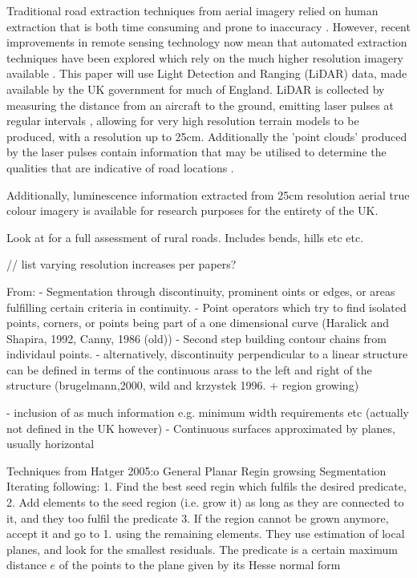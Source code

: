 \begin{multicols}{2}
Traditional road extraction techniques from aerial imagery relied on human extraction that is both time consuming and prone to inaccuracy \citep{wang2015}. However, recent improvements in remote sensing technology now mean that automated extraction techniques have been explored which rely on the much higher resolution imagery available \citep{xu2018}. This paper will use Light Detection and Ranging (LiDAR) data, made available by the UK government for much of England. LiDAR is collected by measuring the distance from an aircraft to the ground, emitting laser pulses at regular intervals \citep{environmentagency2019}, allowing for very high resolution terrain models to be produced, with a resolution up to 25cm. Additionally the 'point clouds' produced by the laser pulses contain information that may be utilised to determine the qualities that are indicative of road locations \citep[e.g.][]{clode2004}.

Additionally, luminescence information extracted from 25cm resolution aerial true colour imagery is available for research purposes for the entirety of the UK.


Look at \citep{taylor2002} for a full assessment of rural roads. Includes bends, hills etc etc.

// list varying resolution increases per papers?

From: \citep{hatger2005}
- Segmentation through discontinuity, prominent oints or edges, or areas fulfilling certain criteria in continuity.
- Point operators which try to find isolated points, corners, or points being part of a one dimensional curve (Haralick and Shapira, 1992, Canny, 1986 (old))
- Second step building contour chains from individaul points.
- alternatively, discontinuity perpendicular to a linear structure can be defined in terms of the continuous arass to the left and right of the structure (brugelmann,2000, wild and krzystek 1996. + region growing)

- inclusion of as much information e.g. minimum width requirements etc (actually not defined in the UK however)
- Continuous surfaces approximated by planes, usually horizontal

Techniques from Hatger 2005:o
General Planar Regin growsing Segmentation
Iterating following:
1. Find the best seed regin which fulfils the desired predicate,
2. Add elements to the seed region (i.e. grow it) as long as they are connected to it, and they too fulfil the predicate
3. If the region cannot be grown anymore, accept it and go to 1. using the remaining elements.
They use estimation of local planes, and look for the smallest residuals. The predicate is a certain maximum distance $e$ of the points to the plane given by its Hesse normal form


\end{multicols}
